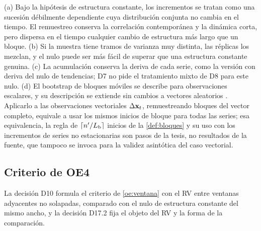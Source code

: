 \begin{observacion}\label{obs:nulo-estructura}
(a) Bajo la hipótesis de estructura constante, los incrementos se tratan como una sucesión
débilmente dependiente cuya distribución conjunta no cambia en el tiempo. El remuestreo conserva
la correlación contemporánea y la dinámica corta, pero dispersa en el tiempo cualquier cambio de
estructura más largo que un bloque. (b) Si la muestra tiene tramos de varianza muy distinta, las
réplicas los mezclan, y el nulo puede ser más fácil de superar que una estructura constante
genuina. (c) La acumulación conserva la deriva de cada serie, como la versión con deriva del nulo
de tendencias; D7 no pide el tratamiento mixto de D8 para este nulo. (d) El bootstrap de bloques
móviles se describe para observaciones escalares, y su descripción se extiende sin cambios a
vectores aleatorios
\parencite[sec.~2.5, p.~29]{lahiri_2003}. Aplicarlo a
las observaciones vectoriales $\Delta\mathbf{x}_t$, remuestreando bloques del vector completo, equivale
a usar los mismos inicios de bloque para todas las series; esa equivalencia, la regla de
$\lceil n'/L_{\mathrm{b}}\rceil$ inicios de la \cref{def:bloques} y su uso con los incrementos de series
no estacionarias son pasos de la tesis, no resultados de la fuente, que tampoco se invoca para
la validez asintótica del caso vectorial.
\end{observacion}

\subsection{Criterio de OE4}
\label{sec:criterio-oe4}

La decisión D10 formula el criterio de \cref{oe:ventana} con el RV entre ventanas adyacentes no
solapadas, comparado con el nulo de estructura constante del mismo ancho, y la decisión D17.2 fija
el objeto del RV y la forma de la comparación.

